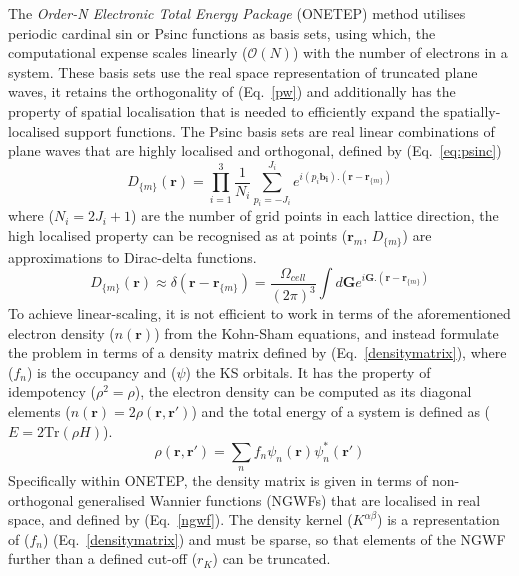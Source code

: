 The \textit{Order-N Electronic Total Energy Package} (ONETEP) method \cite{onetep1, onetep2} utilises periodic cardinal sin or Psinc functions as basis sets, \cite{psinc} using which, the computational expense scales linearly ($\mathcal{O}(N)$) with the number of electrons in a system. These basis sets use the real space representation of truncated plane waves, it retains the orthogonality of (Eq.~\ref{pw}) and additionally has the property of spatial localisation that is needed to efficiently expand the spatially-localised support functions. The Psinc basis sets are real linear combinations of plane waves that are highly localised and orthogonal, defined by (Eq.~\ref{eq:psinc})
\begin{equation}\label{eq:psinc}
D_{\{m\}} \mathbf{(r)} = \prod_{i=1}^3 \frac{1}{N_i} \sum_{p_i = - J_i}^{J_i} e^{i (p_i \mathbf{b_i}).(\mathbf{r - r}_{\{m\}})}
\end{equation}
%
where ($N_i = 2J_i +1$) are the number of grid points in each lattice direction, the high localised property can be recognised as at points ($\mathbf{r}_m$, $D_{\{m\}}$) are approximations to Dirac-delta functions.
%
\begin{equation}
D_{\{m\}} \mathbf{(r)} \approx \delta ( \mathbf{r - r}_{\{m\}}) = \frac{\Omega_{cell}}{(2 \pi)^3} \int d \mathbf{G} e^{i \mathbf{G}.(\mathbf{r - r}_{\{m\}})}
\end{equation}
%
%
To achieve linear-scaling, it is not efficient to work in terms of the aforementioned electron density ($n(\mathbf{r})$) from the Kohn-Sham equations, and instead formulate the problem in terms of a density matrix defined by (Eq.~\ref{densitymatrix}), where ($f_n$) is the occupancy and ($\psi$) the KS orbitals. It has the property of idempotency ($\rho^2 = \rho$), the electron density can be computed as its diagonal elements ($n(\mathbf{r}) = 2 \rho(\mathbf{r, r'})$) and the total energy of a system is defined as ($E = 2\mathrm{Tr} (\rho H)$).
%
\begin{equation} \label{densitymatrix}
\rho(\mathbf{r, r'}) = \sum_n f_n \psi_n(\mathbf{r}) \psi_n^*(\mathbf{r'})
\end{equation} 
%
Specifically within ONETEP, the density matrix is given in terms of non-orthogonal generalised Wannier functions (NGWFs) that are localised in real space,\cite{psinc} and defined by (Eq.~\ref{ngwf}). The density kernel ($K^{\alpha \beta}$) is a representation of ($f_n$) (Eq.~\ref{densitymatrix}) and must be sparse, so that elements of the NGWF further than a defined cut-off ($r_K$) can be truncated.
